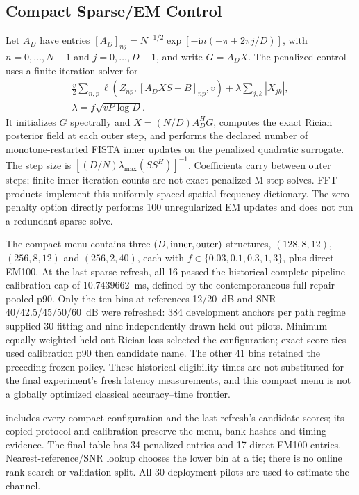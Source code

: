 \subsection{Compact Sparse/EM Control}
Let $A_D$ have entries $[A_D]_{nj}=N^{-1/2}\exp[-\mathrm{i}n(-\pi+2\pi j/D)]$, with $n=0,\ldots,N-1$ and $j=0,\ldots,D-1$, and write $G=A_DX$. The penalized control uses a finite-iteration solver for
\begin{equation}
 \begin{gathered}
 \frac{v}{2}\sum_{n,p}\ell(Z_{np},[A_DXS+B]_{np},v)
 +\lambda\sum_{j,k}|X_{jk}|,\\
 \lambda=f\sqrt{vP\log D}.
 \end{gathered}
\end{equation}
It initializes $G$ spectrally and $X=(N/D)A_D^HG$, computes the exact Rician posterior field at each outer step, and performs the declared number of monotone-restarted FISTA inner updates on the penalized quadratic surrogate. The step size is $[(D/N)\lambda_{\max}(SS^H)]^{-1}$. Coefficients carry between outer steps; finite inner iteration counts are not exact penalized M-step solves. FFT products implement this uniformly spaced spatial-frequency dictionary. The zero-penalty option directly performs 100 unregularized EM updates and does not run a redundant sparse solve.

The compact menu contains three $(D,\hbox{inner},\hbox{outer})$ structures, $(128,8,12)$, $(256,8,12)$ and $(256,2,40)$, each with $f\in\{0.03,0.1,0.3,1,3\}$, plus direct EM100. At the last sparse refresh, all 16 passed the historical complete-pipeline calibration cap of 10.7439662~ms, defined by the contemporaneous full-repair pooled p90. Only the ten bins at references 12/20~dB and SNR 40/42.5/45/50/60~dB were refreshed: 384 development anchors per path regime supplied 30 fitting and nine independently drawn held-out pilots. Minimum equally weighted held-out Rician loss selected the configuration; exact score ties used calibration p90 then candidate name. The other 41 bins retained the preceding frozen policy. These historical eligibility times are not substituted for the final experiment's fresh latency measurements, and this compact menu is not a globally optimized classical accuracy--time frontier.

 includes every compact configuration and the last refresh's candidate scores; its copied protocol and calibration preserve the menu, bank hashes and timing evidence. The final table has 34 penalized entries and 17 direct-EM100 entries. Nearest-reference/SNR lookup chooses the lower bin at a tie; there is no online rank search or validation split. All 30 deployment pilots are used to estimate the channel.


